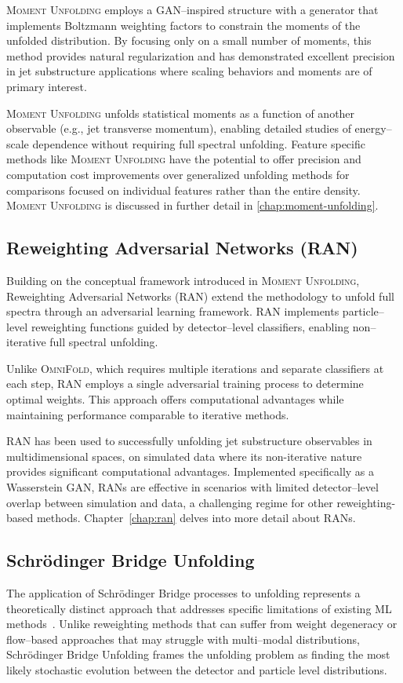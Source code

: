     \textsc{Moment Unfolding} employs a GAN--inspired structure with a generator that implements Boltzmann weighting factors to constrain the moments of the unfolded distribution.
    By focusing only on a small number of moments, this method provides natural regularization and has demonstrated excellent precision in jet substructure applications where scaling behaviors and moments are of primary interest.

    \textsc{Moment Unfolding} unfolds statistical moments as a function of another observable (e.g., jet transverse momentum), enabling detailed studies of energy--scale dependence without requiring full spectral unfolding.
    Feature specific methods like \textsc{Moment Unfolding} have the potential to offer precision and computation cost improvements over generalized unfolding methods for comparisons focused on individual features rather than the entire density.
    \textsc{Moment Unfolding} is discussed in further detail in \cref{chap:moment-unfolding}.

\subsection{Reweighting Adversarial Networks (RAN)}

    Building on the conceptual framework introduced in \textsc{Moment Unfolding}, Reweighting Adversarial Networks (RAN) extend the methodology to unfold full spectra through an adversarial learning framework.
    RAN implements particle--level reweighting functions guided by detector--level classifiers, enabling non--iterative full spectral unfolding.

    Unlike \textsc{OmniFold}, which requires multiple iterations and separate classifiers at each step, RAN employs a single adversarial training process to determine optimal weights.
    This approach offers computational advantages while maintaining performance comparable to iterative methods.

    RAN has been used to successfully unfolding jet substructure observables in multidimensional spaces, on simulated data where its non-iterative nature provides significant computational advantages.
    Implemented specifically as a Wasserstein GAN, RANs are effective in scenarios with limited detector--level overlap between simulation and data, a challenging regime for other reweighting-based methods.
    Chapter~\ref{chap:ran} delves into more detail about RANs.

\subsection{Schr\"odinger Bridge Unfolding}
    The application of Schr\"odinger Bridge processes to unfolding represents a theoretically distinct approach that addresses specific limitations of existing ML methods~\cite{Vargas2021SolvingBridges,Diefenbacher:2023wec}.
    Unlike reweighting methods that can suffer from weight degeneracy or flow--based approaches that may struggle with multi--modal distributions, Schr\"odinger Bridge Unfolding frames the unfolding problem as finding the most likely stochastic evolution between the detector and particle level distributions.

